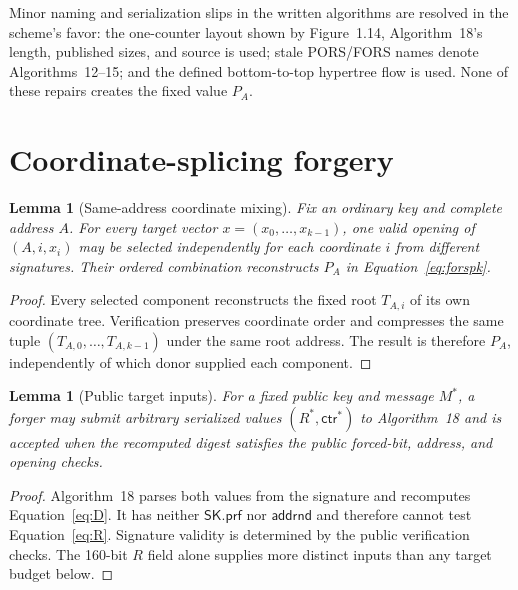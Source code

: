 \documentclass[11pt,a4paper]{article}
\newtheorem{lemma}[theorem]{Lemma}
\newcommand{\sk}{\ensuremath{\mathsf{SK}}}
\begin{document}
Minor naming and serialization slips in the written algorithms are resolved
in the scheme's favor: the one-counter layout shown by Figure~1.14,
Algorithm~18's length, published sizes, and source is used; stale PORS/FORS
names denote Algorithms~12--15; and the defined bottom-to-top hypertree flow is
used.  None of these repairs creates the fixed value $P_A$.

\section{Coordinate-splicing forgery}

\begin{lemma}[Same-address coordinate mixing]\label{lem:mix}
Fix an ordinary key and complete address $A$.  For every target vector
$x=(x_0,\ldots,x_{k-1})$, one valid opening of $(A,i,x_i)$ may be selected
independently for each coordinate $i$ from different signatures.  Their
ordered combination reconstructs $P_A$ in Equation~\eqref{eq:forspk}.
\end{lemma}
\begin{proof}
Every selected component reconstructs the fixed root $T_{A,i}$ of its own
coordinate tree.  Verification preserves coordinate order and compresses the
same tuple $(T_{A,0},\ldots,T_{A,k-1})$ under the same root address.  The result
is therefore $P_A$, independently of which donor supplied each component.
\end{proof}

\begin{lemma}[Public target inputs]\label{lem:public}
For a fixed public key and message $M^*$, a forger may submit arbitrary
serialized values $(R^*,\mathsf{ctr}^*)$ to Algorithm~18 and is accepted when
the recomputed digest satisfies the public forced-bit, address, and opening
checks.
\end{lemma}
\begin{proof}
Algorithm~18 parses both values from the signature and recomputes
Equation~\eqref{eq:D}.  It has neither $\sk.\mathsf{prf}$ nor
$\mathsf{addrnd}$ and therefore cannot test Equation~\eqref{eq:R}.  Signature
validity is determined by the public verification checks.  The 160-bit $R$
field alone supplies more distinct inputs than any target budget below.
\end{proof}
\end{document}
